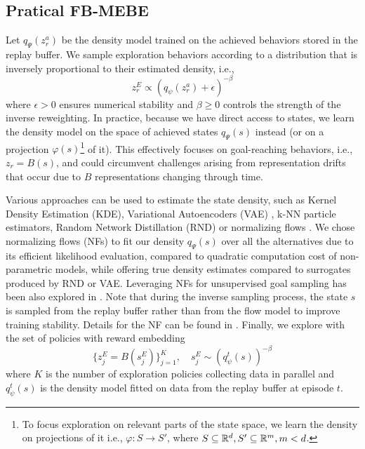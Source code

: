 \subsection{Pratical FB-MEBE}
Let $q_\Psi(z^a_r)$ be the density model trained on the achieved behaviors stored in the replay buffer. We sample exploration behaviors according to a distribution that is inversely proportional to their estimated density, i.e., 
\begin{equation}
\label{eq:sample_inv}
   z_r^E \propto ({q}_\psi(z^a_r) + \epsilon)^{-\beta}
\end{equation}
where $\epsilon > 0$ ensures numerical stability and $\beta \ge 0$ controls the strength of the inverse reweighting. 
In practice, because we have direct access to states, we learn the density model on the space of achieved states $q_\Psi(s)$ instead (or on a projection $\varphi(s)$\footnote{To focus exploration on relevant parts of the state space, we learn the density on projections of it i.e., $\varphi: S \rightarrow S'$, where $S\subseteq{\mathbb{R}}^d, S' \subseteq {\mathbb{R}}^{m}, m<d$.} of it). This effectively focuses on goal-reaching behaviors, i.e., $z_r=B(s)$, and could circumvent challenges arising from representation drifts that occur due to $B$ representations changing through time. 




 Various approaches can be used to estimate the state density, such as Kernel Density Estimation (KDE), Variational Autoencoders (VAE) \citep{kingma2013auto}, k-NN particle estimators, Random Network Distillation (RND) \citep{rnd} or normalizing flows \citep{rezende2015variational}. We chose normalizing flows (NFs) to fit our density $q_\Psi(s)$ over all the alternatives due to its efficient likelihood evaluation, compared to quadratic computation cost of non-parametric models, while offering true density estimates compared to surrogates produced by RND or VAE. Leveraging NFs for unsupervised goal sampling has been also explored in \citep{normalizing-flow-rl}. Note that during the inverse sampling process, the state $s$ is sampled from the replay buffer rather than from the flow model to improve training stability. Details for the NF can be found in . Finally, we explore with the set of policies with reward embedding
\begin{equation}
\label{eq:practical_fb_mebe}
\{z_j^E = B(s_j^E)\}_{j=1}^K,  \quad s_j^E \sim ({q}^t_\psi(s))^{-\beta}
\end{equation}
where $K$ is the number of exploration policies collecting data in parallel and ${q}^t_\psi(s)$ is the density model fitted on data from the replay buffer at episode $t$. 


